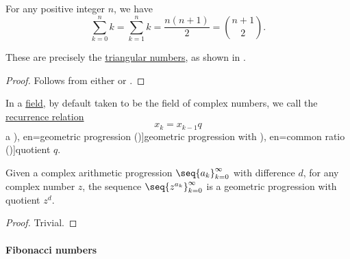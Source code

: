 \begin{corollary}\label{thm:numeric_arithmetic_progression_partial_sums}
  For any positive integer \( n \), we have
  \begin{equation}\label{eq:thm:numeric_arithmetic_progression_partial_sums}
    \sum_{k=0}^n k = \sum_{k=1}^n k = \frac {n (n + 1)} 2 = \binom {n+1} 2.
  \end{equation}
\end{corollary}
\begin{comments}
  \item These are precisely the \hyperref[def:triangular_number]{triangular numbers}, as shown in .
\end{comments}
\begin{proof}
  Follows from either  or .
\end{proof}

\begin{definition}\label{def:geometric_progression}
  In a \hyperref[def:field]{field}, by default taken to be the field of complex numbers, we call the \hyperref[def:recurrence_relation]{recurrence relation}
  \begin{equation}\label{eq:def:geometric_progression}
    x_k = x_{k-1} q
  \end{equation}
  a \term[ru=геометрическая прогрессия (\cite[144]{АлександровМаркушевичХинчин1952ЭнциклопедияТом3}), en=geometric progression (\cite[def. 2.4.2]{Rosen2019DiscreteMathematics})]{geometric progression} with \term[ru=знаменатель (прогрессии) (\cite[\S 227]{Киселёв2004Геометрия}), en=common ratio (\cite[def. 2.4.2]{Rosen2019DiscreteMathematics})]{quotient} \( q \).
\end{definition}

\begin{proposition}\label{thm:arithmetic_to_geometric_progression}
  Given a complex arithmetic progression \( \seq{ a_k }_{k=0}^\infty \) with difference \( d \), for any complex number \( z \), the sequence \( \seq{ z^{a_k} }_{k=0}^\infty \) is a geometric progression with quotient \( z^d \).
\end{proposition}
\begin{proof}
  Trivial.
\end{proof}

\paragraph{Fibonacci numbers}

